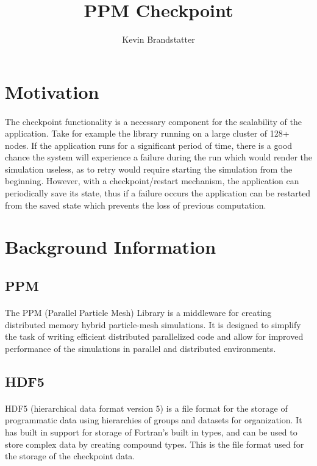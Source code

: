 \documentclass{article}
\title{PPM Checkpoint}
\author{Kevin Brandstatter}
\begin{document}
\maketitle
\section{Motivation}
\paragraph{}
The checkpoint functionality is a necessary component for the scalability of the application. Take for example the library running on a large cluster of 128+ nodes. If the application runs for a significant period of time, there is a good chance the system will experience a failure during the run which would render the simulation useless, as to retry would require starting the simulation from the beginning. However, with a checkpoint/restart mechanism, the application can periodically save its state, thus if a failure occurs the application can be restarted from the saved state which prevents the loss of previous computation.

\section{Background Information}
\subsection{PPM}
\paragraph{}
The PPM (Parallel Particle Mesh) Library is a middleware for creating distributed memory hybrid particle-mesh simulations. It is designed to simplify the task of writing efficient distributed parallelized code and allow for improved performance of the simulations in parallel and distributed environments.

\subsection{HDF5}
\paragraph{}
HDF5 (hierarchical data format version 5) is a file format for the storage of programmatic data using hierarchies of groups and datasets for organization. It has built in support for storage of Fortran's built in types, and can be used to store complex data by creating compound types. This is the file format used for the storage of the checkpoint data.
\end{document}
